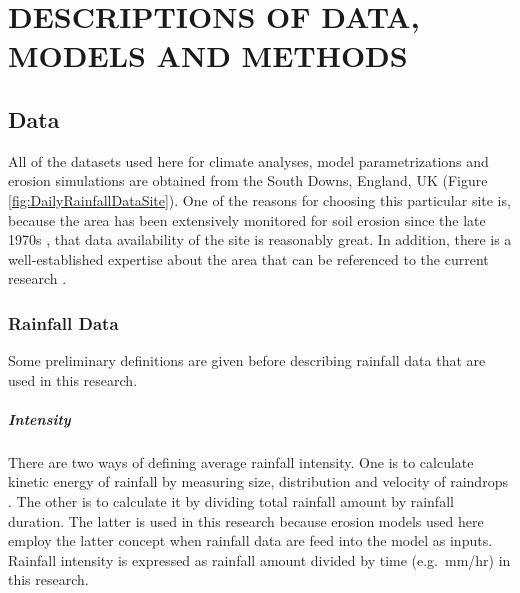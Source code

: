 \chapter{DESCRIPTIONS OF DATA, MODELS AND METHODS}
\label{sec:SIMULATIONDATAMODELSANDMETHODS}

\section{Data}
\label{sec:Data}

All of the datasets used here for climate analyses, model parametrizations and
erosion simulations are obtained from the South Downs, England, UK (Figure
\ref{fig:DailyRainfallDataSite}).
One of the reasons for choosing this particular site is, because the area has
been extensively monitored for soil erosion since the late 1970s
\citep{boardman1995-177,boardman2003-176}, that data availability of the
site is reasonably great. In addition, there is a well-established expertise
about the area that can be referenced to the current research
\citep{boardman1995-177,favis-mortlock1995-365,favis-mortlock1997-79,
favis-mortlock1998-141,boardman2001-346,boardman2003-176}.

\subsection{Rainfall Data}
\label{sec:RainfallData}

Some preliminary definitions are given before describing rainfall data that are
used in this research.

\paragraph{Intensity} There are two ways of defining average
rainfall intensity. One is to calculate kinetic energy of rainfall by measuring
size, distribution and velocity of raindrops \citep{vandijk2002-1}. The other is
to calculate it by dividing total rainfall amount by rainfall duration. The
latter is used in this research because erosion models used here employ the
latter concept when rainfall data are feed into the model as inputs. Rainfall
intensity is expressed as rainfall amount divided by time (e.g.\ mm/hr) in this
research.

